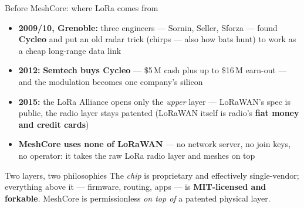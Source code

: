 \documentclass[aspectratio=\baAspect,t,9pt]{beamer}
\begin{document}
\begin{frame}{Before MeshCore: where LoRa comes from}
  \begin{itemize}
    \item \textbf{2009/10, Grenoble:} three engineers --- Sornin, Seller,
      Sforza --- found \textbf{Cycleo} and put an old radar trick (chirps ---
      also how bats hunt) to work as a cheap long-range data link
    \item \textbf{2012:} \textbf{Semtech buys Cycleo} --- \$5\,M cash plus up
      to \$16\,M earn-out --- and the modulation becomes one company's silicon
    \item \textbf{2015:} the LoRa Alliance opens only the \emph{upper} layer
      --- LoRaWAN's spec is public, the radio layer stays patented
      (LoRaWAN itself is radio's \textbf{fiat money and credit cards})
    \item \textbf{MeshCore uses none of LoRaWAN} --- no network server, no join
      keys, no operator: it takes the raw LoRa radio layer and meshes on top
  \end{itemize}
  \vfill
  \begin{alertblock}{Two layers, two philosophies}
    The \emph{chip} is proprietary and effectively single-vendor; everything
    above it --- firmware, routing, apps --- is \textbf{MIT-licensed and
    forkable}. MeshCore is permissionless \emph{on top of} a patented physical
    layer.
  \end{alertblock}
\end{frame}
\end{document}

